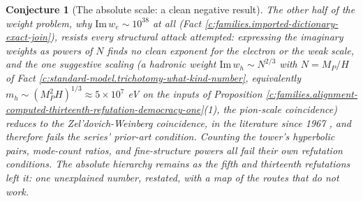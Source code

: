 \documentclass[11pt]{article}
\newtheorem{conjecture}[theorem]{Conjecture}
\theoremstyle{definition}
\theoremstyle{plain}
\begin{document}
\begin{conjecture}[The absolute scale: a clean negative result]\label{c:families.absolute-scale-clean-negative-result}
The other half of the weight problem, why $\mathrm{Im}\,w_{e} \sim 10^{38}$ at all (Fact \ref{c:families.imported-dictionary-exact-join}), resists every structural attack attempted: expressing the imaginary weights as powers of $N$ finds no clean exponent for the electron or the weak scale, and the one suggestive scaling (a hadronic weight $\mathrm{Im}\,w_{h} \sim N^{2/3}$ with $N = M_{P}/H$ of Fact \ref{c:standard-model.trichotomy-what-kind-number}, equivalently $m_{h} \sim (M_{P}^{2}H)^{1/3} \approx 5 \times 10^{7}$ eV on the inputs of Proposition \ref{c:families.alignment-computed-thirteenth-refutation-democracy-one}(1), the pion-scale coincidence) reduces to the Zel'dovich-Weinberg coincidence, in the literature since 1967 \cite{Zeldovich1967, Weinberg1972}, and therefore fails the series' prior-art condition. Counting the tower's hyperbolic pairs, mode-count ratios, and fine-structure powers all fail their own refutation conditions. The absolute hierarchy remains as the fifth and thirteenth refutations left it: one unexplained number, restated, with a map of the routes that do not work.
\end{conjecture}
\end{document}
